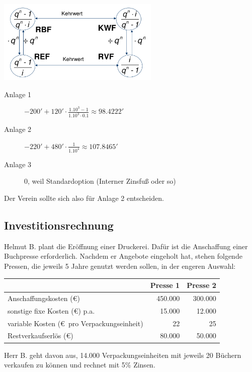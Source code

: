 \documentclass[11pt, a4paper]{article}
\begin{document}
\includegraphics[height=4cm]{RentenUndKapitalfaktoren.png}

\begin{description}
	\item[Anlage 1] $- 200' + 120' \cdot \frac{1.10^3 - 1}{1.10^3 \cdot 0.1} \approx 98.4222'$
	\item[Anlage 2] $- 220' + 480' \cdot \frac{1}{1.10^4} \approx 107.8465'$
	\item[Anlage 3] 0, weil Standardoption (Interner Zinsfuß oder so)
\end{description}
Der Verein sollte sich also für Anlage 2 entscheiden.

\subsection{Investitionsrechnung}
Helmut B. plant die Eröffnung einer Druckerei. Dafür ist die Anschaffung einer Buchpresse erforderlich. Nachdem er Angebote eingeholt hat, stehen folgende Pressen, die jeweils 5 Jahre genutzt werden sollen, in der engeren Auswahl:

\vspace{\baselineskip}
\begin{tabular}{l|r|r}
	& Presse 1 & Presse 2 \\ \hline
	Anschaffungskosten (\euro) & 450.000 & 300.000 \\
	sonstige fixe Kosten (\euro) p.a. & 15.000 & 12.000 \\
	variable Kosten (\euro \ pro Verpackungseinheit) & 22 & 25 \\
	Restverkaufserlös (\euro) & 80.000 & 50.000
\end{tabular}

\vspace{\baselineskip}
Herr B. geht davon aus, 14.000 Verpackungseinheiten mit jeweils 20 Büchern verkaufen zu können und rechnet mit 5\% Zinsen.
\end{document}
